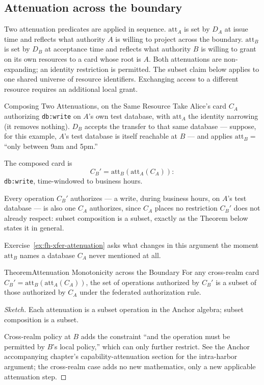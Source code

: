 \documentclass[11pt,a4paper]{article}
\theoremstyle{definition}
\theoremstyle{remark}
\begin{document}
\subsection{Attenuation across the boundary}\label{sec:fh-xfer-att}

Two attenuation predicates are applied in sequence. $\mathrm{att}_A$ is set by $D_A$ at issue time and reflects what authority $A$ is willing to project across the boundary. $\mathrm{att}_B$ is set by $D_B$ at acceptance time and reflects what authority $B$ is willing to grant on its own resources to a card whose root is $A$. Both attenuations are non-expanding; an identity restriction is permitted.
The subset claim below applies to one shared universe of resource identifiers.
Exchanging access to a different resource requires an additional local grant.

\begin{pdexample}{Composing Two Attenuations, on the Same Resource}
\setlength{\parskip}{4pt plus 1pt}
Take Alice's card $C_A$ authorizing \texttt{db:write} on $A$'s own test database, with $\mathrm{att}_A$ the identity narrowing (it removes nothing). $D_B$ accepts the transfer to that same database --- suppose, for this example, $A$'s test database is itself reachable at $B$ --- and applies $\mathrm{att}_B=$ ``only between 9am and 5pm.''

The composed card is \[
C_B'=\mathrm{att}_B(\mathrm{att}_A(C_A)):
\] \texttt{db:write}, time-windowed to business hours.

Every operation $C_B'$ authorizes --- a write, during business hours, on $A$'s test database --- is also one $C_A$ authorizes, since $C_A$ places no restriction $C_B'$ does not already respect: subset composition is a subset, exactly as the Theorem below states it in general.

Exercise~\ref{ex:fh-xfer-attenuation} asks what changes in this argument the moment $\mathrm{att}_B$ names a database $C_A$ never mentioned at all.
\end{pdexample}

\begin{pdclaim}{Theorem}{Attenuation Monotonicity across the Boundary}
\setlength{\parskip}{4pt plus 1pt}
\label{lem:fh-att}
For any cross-realm card $C_B' = \mathrm{att}_B(\mathrm{att}_A(C_A))$, the set of operations authorized by $C_B'$ is a subset of those authorized by $C_A$ under the federated authorization rule.
\end{pdclaim}

\begin{proof}[Sketch]
\setlength{\parskip}{4pt plus 1pt}
Each attenuation is a subset operation in the Anchor algebra; subset composition is a subset. 

Cross-realm policy at $B$ adds the constraint ``and the operation must be permitted by $B$'s local policy,'' which can only further restrict. See the Anchor accompanying chapter's capability-attenuation section for the intra-harbor argument; the cross-realm case adds no new mathematics, only a new applicable attenuation step.
\end{proof}
\end{document}
